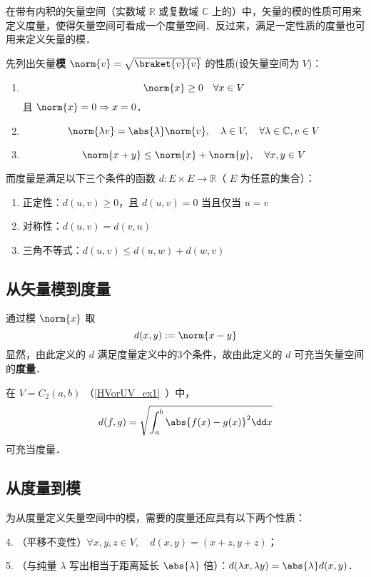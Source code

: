 

在带有内积的矢量空间（实数域 $\mathbb R$ 或复数域 $\mathbb C$ 上的）中，矢量的模的性质可用来定义度量，使得矢量空间可看成一个度量空间．反过来，满足一定性质的度量也可用来定义矢量的模．

先列出矢量\textbf{模} $\norm{v}=\sqrt{\braket{v}{v}}$ 的性质(设矢量空间为 $V$)：
\begin{enumerate}
\item 
\begin{equation}
\norm{x}\geq 0\quad \forall x\in V
\end{equation}
且 $\norm{x}=0\Rightarrow x=0$．
\item \begin{equation}
\norm{\lambda v}=\abs{\lambda}\norm{v},\quad \lambda\in V,\quad\forall\lambda\in\mathbb C,v\in V
\end{equation}
\item 
\begin{equation}
\norm{x+y}\leq\norm{x}+\norm{y},\quad \forall x,y\in V
\end{equation}
\end{enumerate}

而度量是满足以下三个条件的函数 $d:E\times E\rightarrow\mathbb R$（ $E$ 为任意的集合）：
\begin{enumerate}
\item 正定性：$d(u, v) \geq 0$，且 $d(u, v)=0$ 当且仅当 $u=v$
\item 对称性：$d(u, v) = d(v, u)$
\item 三角不等式：$d(u, v) \leqslant d(u, w) + d(w, v)$
\end{enumerate}
\subsection{从矢量模到度量}
通过模 $\norm{x}$ 取
\begin{equation}
d(x,y):=\norm{x-y}
\end{equation}
显然，由此定义的 $d$ 满足度量定义中的3个条件，故由此定义的 $d$ 可充当矢量空间的\textbf{度量}．
\begin{example}{}
在 $V=C_2(a,b)$ （\autoref{HVorUV_ex1}~）中，
\begin{equation}
d(f,g)=\sqrt{\int_a^b\abs{f(x)-g(x)}^2\dd x}
\end{equation}
可充当度量．
\end{example}
\subsection{从度量到模}
为从度量定义矢量空间中的模，需要的度量还应具有以下两个性质：

4. （平移不变性）$\forall x,y,z\in V,\quad d(x,y)=(x+z,y+z)$；

5. （与纯量 $\lambda$ 写出相当于距离延长 $\abs{\lambda}$ 倍）：$d(\lambda x,\lambda y)=\abs{\lambda}d(x,y)$．
